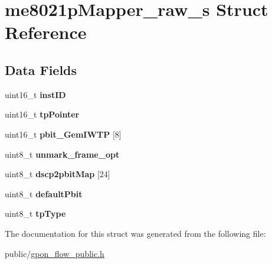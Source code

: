 \hypertarget{structme8021pMapper__raw__s}{}\section{me8021p\+Mapper\+\_\+raw\+\_\+s Struct Reference}
\label{structme8021pMapper__raw__s}
\subsection*{Data Fields}
\begin{DoxyCompactItemize}
\item 
\mbox{\label{structme8021pMapper__raw__s_abb7821835aab3697f71ce931129bbacc}} 
uint16\+\_\+t {\bfseries inst\+ID}
\item 
\mbox{\label{structme8021pMapper__raw__s_a9a4645df9c47a3504315f53b96a05817}} 
uint16\+\_\+t {\bfseries tp\+Pointer}
\item 
\mbox{\label{structme8021pMapper__raw__s_ad90b6f1ea50ebf29478301b55fcce4c3}} 
uint16\+\_\+t {\bfseries pbit\+\_\+\+Gem\+I\+W\+TP} \mbox{[}8\mbox{]}
\item 
\mbox{\label{structme8021pMapper__raw__s_abba9f0889ec185e0bdc49d5e81dad644}} 
uint8\+\_\+t {\bfseries unmark\+\_\+frame\+\_\+opt}
\item 
\mbox{\label{structme8021pMapper__raw__s_a278949e9458c9b0a854dd009644863c9}} 
uint8\+\_\+t {\bfseries dscp2pbit\+Map} \mbox{[}24\mbox{]}
\item 
\mbox{\label{structme8021pMapper__raw__s_a2e92ddb1feea4a29f380f6279f07ed3c}} 
uint8\+\_\+t {\bfseries default\+Pbit}
\item 
\mbox{\label{structme8021pMapper__raw__s_abbaabf9a8f24a22145d3316eea8e9caa}} 
uint8\+\_\+t {\bfseries tp\+Type}
\end{DoxyCompactItemize}


The documentation for this struct was generated from the following file\+:\begin{DoxyCompactItemize}
\item 
public/\hyperlink{gpon__flow__public_8h}{gpon\+\_\+flow\+\_\+public.\+h}\end{DoxyCompactItemize}
